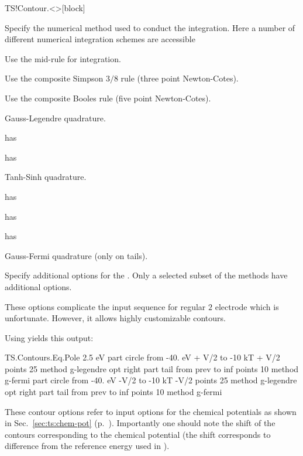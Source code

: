 \begin{fdfentry}{TS!Contour.<>}[block]
\begin{fdfoptions}
    Specify the numerical method used to conduct the integration. Here
    a number of different numerical integration schemes are accessible

    \begin{fdfoptions}
      Use the mid-rule for integration.

      Use the composite Simpson $3/8$ rule (three point Newton-Cotes).

      Use the composite Booles rule (five point Newton-Cotes).
 
      \option[G-legendre]%
      Gauss-Legendre quadrature.

      \note has 
      
      \note has 

      Tanh-Sinh quadrature.

      \note has 

      \note has 
      
      \note has 

      \option[G-Fermi]%
      Gauss-Fermi quadrature (only on tails).

    \end{fdfoptions}

    \option[opt]%

    Specify additional options for the . Only a selected
    subset of the methods have additional options.

  \end{fdfoptions}
  
\end{fdfentry}

These options complicate the input sequence for regular $2$ electrode
which is unfortunate. However, it allows highly customizable contours.

Using  yields this output:
\begin{fdfexample}
  TS.Contours.Eq.Pole 2.5 eV
    part circle
     from -40. eV + V/2 to -10 kT + V/2
       points 25
        method g-legendre
         opt right
    part tail
     from prev to inf
       points 10
        method g-fermi
    part circle
     from -40. eV -V/2 to -10 kT -V/2
       points 25
        method g-legendre
         opt right
    part tail
     from prev to inf
       points 10
        method g-fermi
\end{fdfexample}
These contour options refer to input options for the chemical
potentials as shown in Sec.~\ref{sec:ts:chem-pot}
(p.~\pageref{sec:ts:chem-pot}). Importantly one should note the shift
of the contours corresponding to the chemical potential (the shift
corresponds to difference from the reference energy used in \tsiesta).


